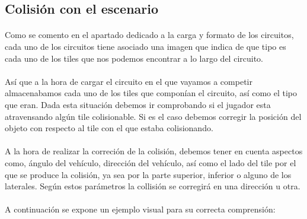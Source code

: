 \subsection{Colisión con el escenario}

\paragraph{}
Como se comento en el apartado dedicado a la carga y formato de los circuitos, cada uno de los circuitos tiene asociado una imagen
que indica de que tipo es cada uno de los tiles que nos podemos encontrar a lo largo del circuito.

\paragraph{}
Así que a la hora de cargar el circuito en el que vayamos a competir almacenabamos cada uno de los tiles que componían el circuito,
así como el tipo que eran. Dada esta situación debemos ir comprobando si el jugador esta atravensando algún tile colisionable. 
Si es el caso debemos corregir la posición del objeto con respecto al tile con el que estaba colisionando.

\paragraph{}
A la hora de realizar la correción de la colisión, debemos tener en cuenta aspectos como, ángulo del vehículo, dirección del 
vehículo, así como el lado del tile por el que se produce la colisión, ya sea por la parte superior, inferior o alguno 
de los laterales. Según estos parámetros la collisión se corregirá en una dirección u otra.

\paragraph{}
A continuación se expone un ejemplo visual para su correcta comprensión:

